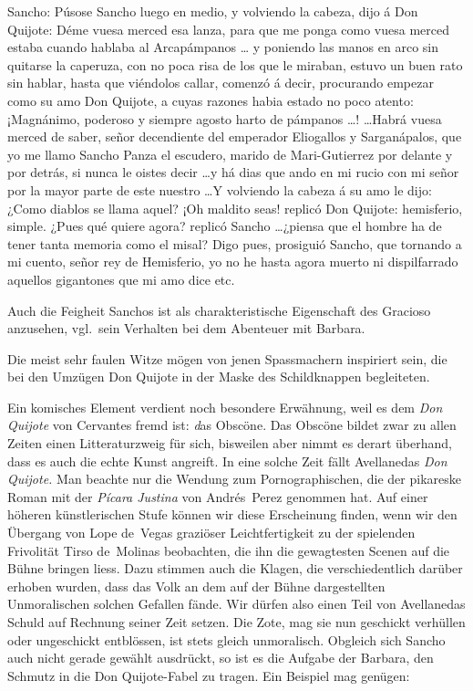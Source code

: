Sancho: {\itquoted\spanish Púsose Sancho luego en medio, y volviendo la cabeza,
dijo á Don Quijote: Déme vuesa merced esa lanza, para que me
ponga como vuesa merced estaba cuando hablaba al Arcapámpanos \dots
y poniendo las manos en arco sin quitarse la caperuza, con no poca
risa de los que le miraban, estuvo un buen rato sin hablar, hasta que
viéndolos callar, comenzó á decir, procurando empezar como su amo
Don Quijote, a cuyas razones habia estado no poco atento: ¡Magnánimo,
poderoso y siempre agosto harto de pámpanos \dots! \dots Habrá vuesa
merced de saber, señor decendiente del emperador Eliogallos y Sarganápalos,
que yo me llamo Sancho Panza el escudero, marido de Mari-Gutierrez
por delante y por detrás, si nunca le oistes decir \dots y há dias
que ando en mi rucio con mi señor por la mayor parte de este nuestro
\dots Y volviendo la cabeza á su amo le dijo: ¿Como diablos se llama
aquel? ¡Oh maldito seas! replicó Don Quijote: hemisferio, simple.
¿Pues qué quiere agora? replicó Sancho \dots ¿piensa que el hombre
ha de tener tanta memoria como el misal? Digo pues, prosiguió Sancho,
que tornando a mi cuento, señor rey de Hemisferio, yo no he hasta
agora muerto ni dispilfarrado aquellos gigantones que mi amo dice} etc.

Auch die Feigheit Sanchos ist als charakteristische Eigenschaft des
Gracioso anzusehen, vgl.~sein Verhalten bei dem Abenteuer mit Barbara.

Die meist sehr faulen Witze mögen von jenen Spassmachern inspiriert
sein, die bei den Umzügen Don Quijote in der Maske des
Schildknappen begleiteten.

Ein komisches Element verdient noch besondere Erwähnung, weil
es dem {\it Don Quijote} von Cervantes fremd ist: {\emph das Obscöne}. Das
Obscöne bildet zwar zu allen Zeiten einen Litteraturzweig für sich,
bisweilen aber nimmt es derart überhand, dass es auch die echte Kunst
angreift. In eine solche Zeit fällt Avellanedas {\it Don Quijote.} Man
beachte nur die Wendung zum Pornographischen, die der pikareske Roman
mit der {\it Pícara Justina} von Andrés~Perez genommen hat. Auf einer
höheren künstlerischen Stufe können wir diese Erscheinung finden, wenn
wir den Übergang von Lope de~Vegas graziöser Leichtfertigkeit zu der
spielenden Frivolität Tirso de~Molinas beobachten, die ihn die gewagtesten
Scenen auf die Bühne bringen liess. Dazu stimmen auch die Klagen,
die verschiedentlich darüber erhoben wurden, dass das Volk an dem
auf der Bühne dargestellten Unmoralischen solchen Gefallen fände.
Wir dürfen also einen Teil von Avellanedas Schuld auf Rechnung seiner
Zeit setzen. Die Zote, mag sie nun geschickt verhüllen oder ungeschickt
entblössen, ist stets gleich unmoralisch. Obgleich sich Sancho auch
nicht gerade gewählt ausdrückt, so ist es die Aufgabe der Barbara, den
Schmutz in die Don Quijote-Fabel zu tragen. Ein Beispiel mag genügen:

